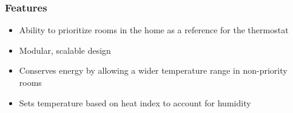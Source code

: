 \subsubsection{Features}
\begin{itemize}
\item
Ability to prioritize rooms in the home as a reference for the thermostat
\item
Modular, scalable design
\item
Conserves energy by allowing a wider temperature range in non-priority rooms
\item
Sets temperature based on heat index to account for humidity
\end{itemize}
